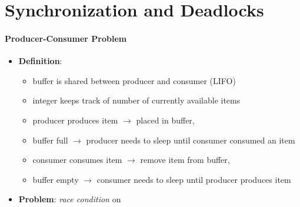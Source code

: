 \section{Synchronization and Deadlocks}

\paragraph{Producer-Consumer Problem}
\begin{itemize}
  \item \textbf{Definition}:
  \begin{itemize}
    \item buffer is shared between producer and consumer (LIFO)
    \item {} integer keeps track of number of currently available items
    \item producer produces item $ \to $ placed in buffer, 
    \item buffer full $ \to $ producer needs to sleep until consumer consumed an item
    \item consumer consumes item $ \to $ remove item from buffer, 
    \item buffer empty $ \to $ consumer needs to sleep until producer produces item
  \end{itemize}
  \item \textbf{Problem}: \emph{race condition} on 
\end{itemize}

